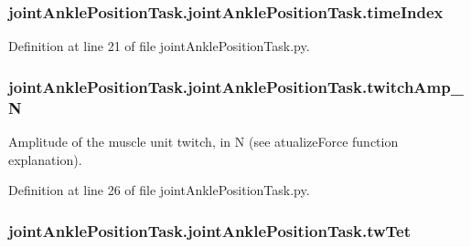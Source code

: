 \subsubsection[{\texorpdfstring{time\+Index}{timeIndex}}]{\setlength{\rightskip}{0pt plus 5cm}joint\+Ankle\+Position\+Task.\+joint\+Ankle\+Position\+Task.\+time\+Index}\hypertarget{classjoint_ankle_position_task_1_1joint_ankle_position_task_ab1f158fc2dc6c087ecf7e5578346b20f}{}\label{classjoint_ankle_position_task_1_1joint_ankle_position_task_ab1f158fc2dc6c087ecf7e5578346b20f}


Definition at line 21 of file joint\+Ankle\+Position\+Task.\+py.

\subsubsection[{\texorpdfstring{twitch\+Amp\+\_\+N}{twitchAmp_N}}]{\setlength{\rightskip}{0pt plus 5cm}joint\+Ankle\+Position\+Task.\+joint\+Ankle\+Position\+Task.\+twitch\+Amp\+\_\+N}\hypertarget{classjoint_ankle_position_task_1_1joint_ankle_position_task_a2bf7ec4c6e53b71c6129f86059321cb2}{}\label{classjoint_ankle_position_task_1_1joint_ankle_position_task_a2bf7ec4c6e53b71c6129f86059321cb2}


Amplitude of the muscle unit twitch, in N (see atualize\+Force function explanation). 



Definition at line 26 of file joint\+Ankle\+Position\+Task.\+py.

\subsubsection[{\texorpdfstring{tw\+Tet}{twTet}}]{\setlength{\rightskip}{0pt plus 5cm}joint\+Ankle\+Position\+Task.\+joint\+Ankle\+Position\+Task.\+tw\+Tet}\hypertarget{classjoint_ankle_position_task_1_1joint_ankle_position_task_adfb1cc9079bd72286725db5972e11ee7}{}\label{classjoint_ankle_position_task_1_1joint_ankle_position_task_adfb1cc9079bd72286725db5972e11ee7}


